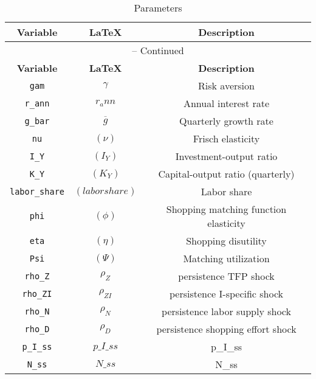 \begin{center}
\begin{longtable}{ccc}
\caption{Parameters}\\%
\hline%
\multicolumn{1}{c}{\textbf{Variable}} &
\multicolumn{1}{c}{\textbf{\LaTeX}} &
\multicolumn{1}{c}{\textbf{Description}}\\%
\hline\hline%
\endfirsthead
\multicolumn{3}{c}{{\tablename} \thetable{} -- Continued}\\%
\hline%
\multicolumn{1}{c}{\textbf{Variable}} &
\multicolumn{1}{c}{\textbf{\LaTeX}} &
\multicolumn{1}{c}{\textbf{Description}}\\%
\hline\hline%
\endhead
\texttt{gam} & ${\gamma}$ & Risk aversion\\
\texttt{r\_ann} & ${r_ann}$ & Annual interest rate\\
\texttt{g\_bar} & ${\overline{g}}$ & Quarterly growth rate\\
\texttt{nu} & $(\nu)$ & Frisch elasticity\\
\texttt{I\_Y} & $(I_Y)$ & Investment-output ratio\\
\texttt{K\_Y} & $(K_Y)$ & Capital-output ratio (quarterly)\\
\texttt{labor\_share} & $(labor share)$ & Labor share\\
\texttt{phi} & $(\phi)$ & Shopping matching function elasticity\\
\texttt{eta} & $(\eta)$ & Shopping disutility\\
\texttt{Psi} & $(\Psi)$ & Matching utilization\\
\texttt{rho\_Z} & ${\rho_Z}$ & persistence TFP shock\\
\texttt{rho\_ZI} & ${\rho_{ZI}}$ & persistence I-specific shock\\
\texttt{rho\_N} & ${\rho_N}$ & persistence labor supply shock\\
\texttt{rho\_D} & ${\rho_D}$ & persistence shopping effort shock\\
\texttt{p\_I\_ss} & $p\_I\_ss$ & p\_I\_ss\\
\texttt{N\_ss} & $N\_ss$ & N\_ss\\
\hline%
\end{longtable}
\end{center}
